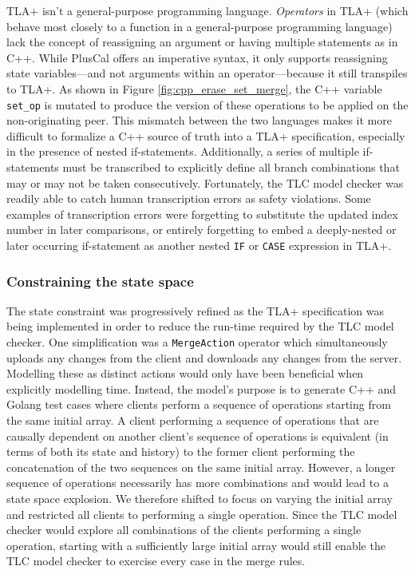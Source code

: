 \documentclass{vldb}
\begin{document}
TLA+ isn't a general-purpose programming language. \emph{Operators} in TLA+ (which behave most closely to a function in a general-purpose programming language) lack the concept of reassigning an argument or having multiple statements as in C++.
While PlusCal offers an imperative syntax, it only supports reassigning state variables---and not arguments within an operator---because it still transpiles to TLA+.
As shown in Figure \ref{fig:cpp_erase_set_merge}, the C++ variable \texttt{set\_op} is mutated to produce the version of these operations to be applied on the non-originating peer. This mismatch between the two languages makes it more difficult to formalize a C++ source of truth into a TLA+ specification, especially in the presence of nested if-statements. Additionally, a series of multiple if-statements must be transcribed to explicitly define all branch combinations that may or may not be taken consecutively. Fortunately, the TLC model checker was readily able to catch human transcription errors as safety violations. Some examples of transcription errors were forgetting to substitute the updated index number in later comparisons, or entirely forgetting to embed a deeply-nested or later occurring if-statement as another nested \texttt{IF} or \texttt{CASE} expression in TLA+.

\subsubsection{Constraining the state space}

The state constraint was progressively refined as the TLA+ specification was being implemented in order to reduce the run-time required by the TLC model checker. One simplification was a \texttt{MergeAction} operator which simultaneously uploads any changes from the client and downloads any changes from the server. Modelling these as distinct actions would only have been beneficial when explicitly modelling time. Instead, the model's purpose is to generate C++ and Golang test cases where clients perform a sequence of operations starting from the same initial array. A client performing a sequence of operations that are causally dependent on another client's sequence of operations is equivalent (in terms of both its state and history) to the former client performing the concatenation of the two sequences on the same initial array. However, a longer sequence of operations necessarily has more combinations and would lead to a state space explosion. We therefore shifted to focus on varying the initial array and restricted all clients to performing a single operation. Since the TLC model checker would explore all combinations of the clients performing a single operation, starting with a sufficiently large initial array would still enable the TLC model checker to exercise every case in the merge rules.
\end{document}
